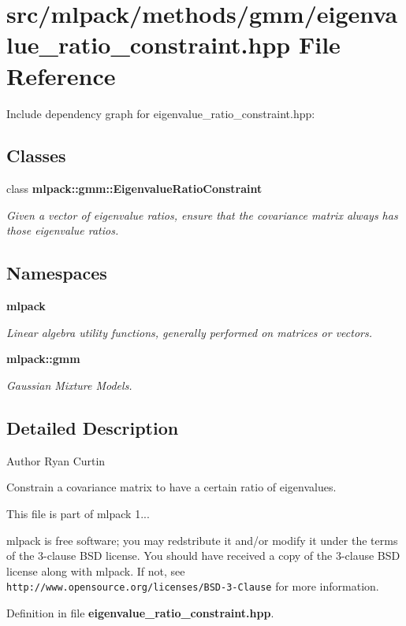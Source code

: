 \section{src/mlpack/methods/gmm/eigenvalue\-\_\-ratio\-\_\-constraint.hpp File Reference}
\label{eigenvalue__ratio__constraint_8hpp}
Include dependency graph for eigenvalue\-\_\-ratio\-\_\-constraint.\-hpp\-:
\subsection*{Classes}
\begin{DoxyCompactItemize}
\item 
class {\bf mlpack\-::gmm\-::\-Eigenvalue\-Ratio\-Constraint}
\begin{DoxyCompactList}\small\item\em Given a vector of eigenvalue ratios, ensure that the covariance matrix always has those eigenvalue ratios. \end{DoxyCompactList}\end{DoxyCompactItemize}
\subsection*{Namespaces}
\begin{DoxyCompactItemize}
\item 
{\bf mlpack}
\begin{DoxyCompactList}\small\item\em Linear algebra utility functions, generally performed on matrices or vectors. \end{DoxyCompactList}\item 
{\bf mlpack\-::gmm}
\begin{DoxyCompactList}\small\item\em Gaussian Mixture Models. \end{DoxyCompactList}\end{DoxyCompactItemize}


\subsection{Detailed Description}
\begin{DoxyAuthor}{Author}
Ryan Curtin
\end{DoxyAuthor}
Constrain a covariance matrix to have a certain ratio of eigenvalues.

This file is part of mlpack 1...

mlpack is free software; you may redstribute it and/or modify it under the terms of the 3-\/clause B\-S\-D license. You should have received a copy of the 3-\/clause B\-S\-D license along with mlpack. If not, see {\tt http\-://www.\-opensource.\-org/licenses/\-B\-S\-D-\/3-\/\-Clause} for more information. 

Definition in file {\bf eigenvalue\-\_\-ratio\-\_\-constraint.\-hpp}.

